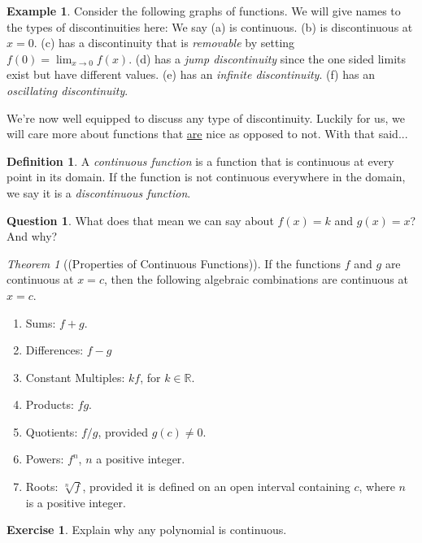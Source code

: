 \documentclass[leqno]{article}
\theoremstyle{definition}
\newtheorem{definition}{Definition}[section]
\newtheorem{example}{Example}[section]
\newtheorem{question}{Question}[section]
\newtheorem{exercise}{Exercise}[section]
\theoremstyle{remark}
\theoremstyle{theorem}
\newtheorem{theorem}{Theorem}[section]
\newcommand{\R}{\mathbb{R}}
\begin{document}
\begin{example}
Consider the following graphs of functions. We will give names to the types of discontinuities here:
\vspace*{8cm}
We say (a) is continuous. (b) is discontinuous at $x=0$. (c) has a discontinuity that is \emph{removable} by setting $f(0)=\lim_{x\to 0} f(x)$. (d) has a \emph{jump discontinuity} since the one sided limits exist but have different values. (e) has an \emph{infinite discontinuity}. (f) has an \emph{oscillating discontinuity}.
\end{example}

We're now well equipped to discuss any type of discontinuity.  Luckily for us, we will care more about functions that \underline{are} nice as opposed to not.  With that said...

\begin{definition}
A \emph{continuous function} is a function that is continuous at every point in its domain. If the function is not continuous everywhere in the domain, we say it is a \emph{discontinuous function}.
\end{definition}

\begin{question}
What does that mean we can say about $f(x)=k$ and $g(x)=x$? And why?
\end{question}

\begin{theorem}[(Properties of Continuous Functions)]
If the functions $f$ and $g$ are continuous at $x=c$, then the following algebraic combinations are continuous at $x=c$.
\begin{enumerate}[1.]
\item Sums: $f+g$.
\item Differences: $f-g$
\item Constant Multiples: $kf$, for $k\in \R$.
\item Products: $fg$.
\item Quotients: $f/g$, provided $g(c)\neq0$.
\item Powers: $f^n$, $n$ a positive integer.
\item Roots: $\sqrt[n]{f}$, provided it is defined on an open interval containing $c$, where $n$ is a positive integer.
\end{enumerate}
\end{theorem}

\begin{exercise}
Explain why any polynomial is continuous.
\vspace*{3cm}
\end{exercise}
\end{document}

